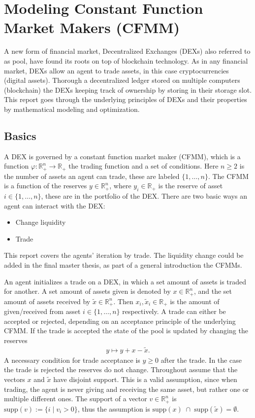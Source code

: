 \chapter{Modeling Constant Function Market Makers (CFMM)}
A new form of financial market, Decentralized Exchanges (DEXs) also referred
to as pool, have found its roots on top of blockchain technology. As in any
financial market, DEXs allow an agent to trade assets, in this case
cryptocurrencies (digital assets). Thorough a decentralized ledger stored on
multiple computers (blockchain) the DEXs keeping track of ownership by
storing in their storage slot. This report goes through the underlying
principles of DEXs and their properties by mathematical modeling and
optimization.

\section{Basics}
A DEX is governed by a constant function market maker (CFMM), which is a
function $\varphi:\mathbb{R}^{n}_{+} \to \mathbb{R}_+$ the trading function
and a set of conditions. Here $n \ge 2$ is the number of assets an agent can
trade, these are labeled $\{1,\ldots, n\}$. The CFMM is a function of the
reserves $y \in \mathbb{R}^{n}_+$, where $y_i \in \mathbb{R}_+$ is the
reserve of asset $i \in \{1,\ldots,n\}$, these are in the portfolio of the
DEX. There are two basic ways an agent can interact with the DEX:
\begin{itemize}
    \item Change liquidity
    \item Trade
\end{itemize}
This report covers the agents' iteration by trade. The liquidity change
could be added in the final master thesis, as part of a general introduction
the CFMMs.

An agent initializes a trade on a DEX, in which a set amount of assets is
traded for another. A set amount of assets given is denoted by $x \in
\mathbb{R}^{n}_+$, and the set amount of assets received by $\tilde{x} \in
\mathbb{R}^{n}_+$. Then $x_i, \tilde{x}_i \in \mathbb{R}_+$ is the amount of
given/received from asset $i \in \{1,\ldots,n\}$ respectively. A trade can either be
accepted or rejected, depending on an acceptance principle of the underlying
CFMM. If the trade is accepted the state of the pool is updated by changing
the reserves
\begin{align}
    y \mapsto y + x - \tilde{x}.
\end{align}
A necessary condition for trade acceptance is $y \ge 0$ after the trade. In
the case the trade is rejected the reserves do not change. Throughout
assume that the vectors $x$ and $\tilde{x}$ have disjoint support. This
is a valid assumption, since when trading, the agent is never giving and receiving
the same asset, but rather one or multiple different ones. The
support of a vector $v \in \mathbb{R}^{n}_+$ is $\text{supp}(v) := \{i\; |\;
v_i > 0\}$, thus the assumption is $\text{supp}(x)\;\cap\;
\text{supp}(\tilde{x}) = \emptyset$.

